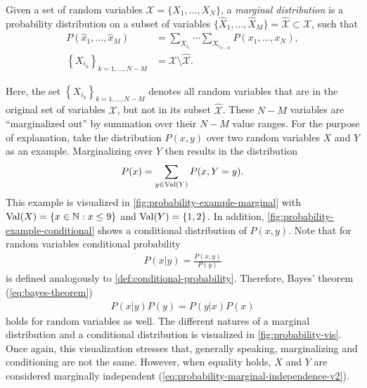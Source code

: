 \begin{mydef}
    \label{def:marginalization}
    Given a set of random variables $\mathcal{X} = \{X_1,\hdots,X_N\}$, a \emph{marginal
        distribution} is a probability distribution on a subset of variables
    $\{\hat{X}_1,\hdots,\hat{X}_M\} = \hat{\mathcal{X}} \subset \mathcal{X}$, such that
    \begin{align}
        \label{eq:marginalization}
        P(\hat{x}_1,\hdots,\hat{x}_M) &= \sum_{X_{i_1}}\cdots\sum_{X_{i_{N-M}}}P(x_1,\hdots,x_N), \\
        \left\{X_{i_k}\right\}_{k=1,\hdots,N-M} &= \mathcal{X} \setminus \mathcal{\hat{X}}.
    \end{align}
\end{mydef}
Here, the set $\left\{X_{i_k}\right\}_{k=1,\hdots,N-M}$ denotes all random variables that are in the
original set of variables $\mathcal{X}$, but not in its subset $\hat{\mathcal{X}}$. These $N-M$
variables are ``marginalized out'' by summation over their $N-M$ value ranges. For the purpose of
explanation, take the distribution $P(x, y)$ over two random variables $X$ and $Y$ as an
example. Marginalizing over $Y$ then results in the distribution
\begin{align}
    \label{eq:probability-marginal-example}
    P(x) = \sum_{y \in \operatorname{Val}(Y)}P(x, Y=y).
\end{align}
This example is visualized in \cref{fig:probability-example-marginal} with $\operatorname{Val}(X)=\{x \in
\mathbb{N} : x \le 9\}$ and \mbox{$\operatorname{Val}(Y)=\{1, 2\}$}. In addition,
\cref{fig:probability-example-conditional} shows a conditional distribution of $P(x,y)$. Note that
for random variables conditional probability
\begin{align}
    \label{eq:random-variable-conditional}
    P(x|y) = \frac{P(x,y)}{P(y)}
\end{align}
is defined analogously to \cref{def:conditional-probability}. Therefore, Bayes' theorem
(\cref{eq:bayes-theorem})
\begin{align}
    \label{eq:bayes-theorem-rv}
    P(x|y)P(y) = P(y|x)P(x)
\end{align}
holds for random variables as well. The different natures of a marginal distribution and a
conditional distribution is visualized in \cref{fig:probability-vis}. Once again, this visualization
stresses that, generally speaking, marginalizing and conditioning are not the same. However, when
equality holds, $X$ and $Y$ are considered marginally independent (\cref{eq:probability-marginal-independence-v2}).
